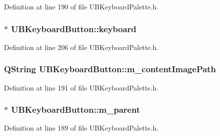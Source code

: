 Definition at line 190 of file U\-B\-Keyboard\-Palette.\-h.

\hypertarget{class_u_b_keyboard_button_a24bb19c40ac54159a6cccac7d2b17202}{
\subsubsection[{keyboard}]{$\ast$ U\-B\-Keyboard\-Button\-::keyboard\hspace{0.3cm}{\ttfamily [protected]}}}\label{d2/d05/class_u_b_keyboard_button_a24bb19c40ac54159a6cccac7d2b17202}


Definition at line 206 of file U\-B\-Keyboard\-Palette.\-h.

\hypertarget{class_u_b_keyboard_button_af438d7515d8543b827e9ec6d3cf63f09}{
\subsubsection[{m\-\_\-content\-Image\-Path}]{\setlength{\rightskip}{0pt plus 5cm}Q\-String U\-B\-Keyboard\-Button\-::m\-\_\-content\-Image\-Path\hspace{0.3cm}{\ttfamily [protected]}}}\label{d2/d05/class_u_b_keyboard_button_af438d7515d8543b827e9ec6d3cf63f09}


Definition at line 191 of file U\-B\-Keyboard\-Palette.\-h.

\hypertarget{class_u_b_keyboard_button_a4942440a8d820ed502f2d36f63882d64}{
\subsubsection[{m\-\_\-parent}]{$\ast$ U\-B\-Keyboard\-Button\-::m\-\_\-parent\hspace{0.3cm}{\ttfamily [protected]}}}\label{d2/d05/class_u_b_keyboard_button_a4942440a8d820ed502f2d36f63882d64}


Definition at line 189 of file U\-B\-Keyboard\-Palette.\-h.



